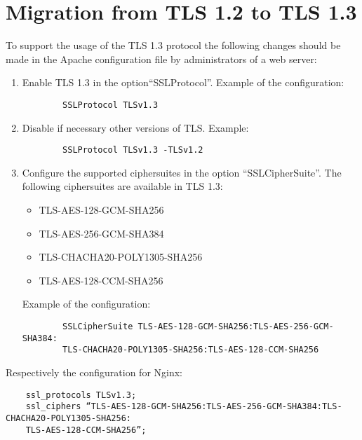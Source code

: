 \chapter{Migration from TLS 1.2 to TLS 1.3}
\label{chap:migration}

To support the usage of the TLS 1.3 protocol the following changes should be made in the Apache configuration file by administrators of a web server:\\
\begin{enumerate}
	\item Enable TLS 1.3 in the option“SSLProtocol”. Example of the configuration:
    \begin{verbatim}
        SSLProtocol TLSv1.3
    \end{verbatim}
    \item Disable if necessary other versions of TLS. Example: 
    \begin{verbatim}
        SSLProtocol TLSv1.3 -TLSv1.2
    \end{verbatim}
    \item Configure the supported ciphersuites in the option “SSLCipherSuite”. The following ciphersuites are available in TLS 1.3:
    \begin{itemize}
        \item TLS-AES-128-GCM-SHA256
        \item TLS-AES-256-GCM-SHA384
        \item TLS-CHACHA20-POLY1305-SHA256
        \item TLS-AES-128-CCM-SHA256
    \end{itemize}
    Example of the configuration:
    \begin{verbatim}
        SSLCipherSuite TLS-AES-128-GCM-SHA256:TLS-AES-256-GCM-SHA384:
        TLS-CHACHA20-POLY1305-SHA256:TLS-AES-128-CCM-SHA256
    \end{verbatim}
\end{enumerate}

Respectively the configuration for Nginx:
\begin{verbatim}
    ssl_protocols TLSv1.3;
    ssl_ciphers “TLS-AES-128-GCM-SHA256:TLS-AES-256-GCM-SHA384:TLS-CHACHA20-POLY1305-SHA256:
    TLS-AES-128-CCM-SHA256”;
\end{verbatim}
